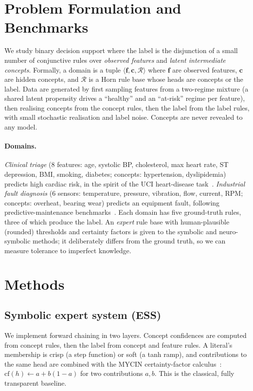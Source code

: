 \documentclass[11pt]{article}
\begin{document}
\section{Problem Formulation and Benchmarks}
\label{sec:data}
We study binary decision support where the label is the disjunction of a small
number of conjunctive rules over \emph{observed features} and \emph{latent
intermediate concepts}. Formally, a domain is a tuple
$\langle \mathbf{f}, \mathbf{c}, \mathcal{R}\rangle$ where $\mathbf{f}$ are
observed features, $\mathbf{c}$ are hidden concepts, and $\mathcal{R}$ is a Horn
rule base whose heads are concepts or the label. Data are generated by first
sampling features from a two-regime mixture (a shared latent propensity drives a
``healthy'' and an ``at-risk'' regime per feature), then realising concepts from
the concept rules, then the label from the label rules, with small stochastic
realisation and label noise. Concepts are never revealed to any model.

\paragraph{Domains.}
\emph{Clinical triage} (8 features: age, systolic BP, cholesterol, max heart
rate, ST depression, BMI, smoking, diabetes; concepts: hypertension,
dyslipidemia) predicts high cardiac risk, in the spirit of the UCI heart-disease
task~\cite{janosi1988heart}. \emph{Industrial fault diagnosis} (6 sensors:
temperature, pressure, vibration, flow, current, RPM; concepts: overheat,
bearing wear) predicts an equipment fault, following predictive-maintenance
benchmarks~\cite{matzka2020ai4i}. Each domain has five ground-truth rules, three
of which produce the label. An \emph{expert} rule base with human-plausible
(rounded) thresholds and certainty factors is given to the symbolic and
neuro-symbolic methods; it deliberately differs from the ground truth, so we can
measure tolerance to imperfect knowledge.

\section{Methods}
\label{sec:methods}

\subsection{Symbolic expert system (ESS)}
We implement forward chaining in two layers. Concept confidences are computed
from concept rules, then the label from concept and feature rules. A literal's
membership is crisp (a step function) or soft (a tanh ramp), and contributions to
the same head are combined with the MYCIN certainty-factor
calculus~\cite{shortliffe1975mycin}: $\mathrm{cf}(h) \leftarrow a + b(1-a)$ for
two contributions $a,b$. This is the classical, fully transparent baseline.
\end{document}
